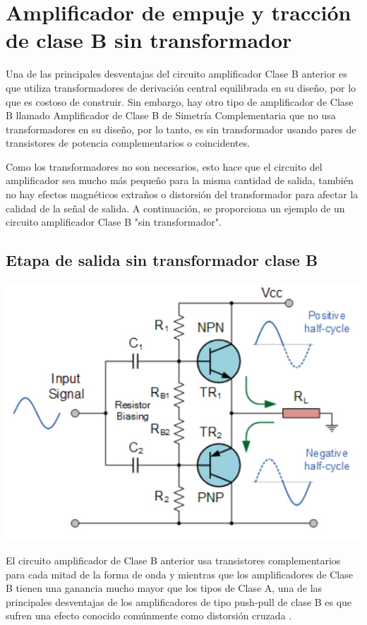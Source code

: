 \documentclass[12pt,a4paper]{article}
\begin{document}
\section{Amplificador de empuje y tracción de clase B sin transformador}
\begin{flushleft}
Una de las principales desventajas del circuito amplificador Clase B anterior es que utiliza transformadores de derivación central equilibrada en su diseño, por lo que es costoso de construir. Sin embargo, hay otro tipo de amplificador de Clase B llamado Amplificador de Clase B de Simetría Complementaria que no usa transformadores en su diseño, por lo tanto, es sin transformador usando pares de transistores de potencia complementarios o coincidentes.\linebreak

Como los transformadores no son necesarios, esto hace que el circuito del amplificador sea mucho más pequeño para la misma cantidad de salida, también no hay efectos magnéticos extraños o distorsión del transformador para afectar la calidad de la señal de salida. A continuación, se proporciona un ejemplo de un circuito amplificador Clase B "sin transformador".\linebreak
\begin{flushleft}
\subsection{Etapa de salida sin transformador clase B}
\begin{center}
\includegraphics[scale=0.6]{imagenes/parametros.JPG} \linebreak
\end{center}
El circuito amplificador de Clase B anterior usa transistores complementarios para cada mitad de la forma de onda y mientras que los amplificadores de Clase B tienen una ganancia mucho mayor que los tipos de Clase A, una de las principales desventajas de los amplificadores de tipo push-pull de clase B es que sufren una efecto conocido comúnmente como distorsión cruzada .\linebreak


\end{flushleft}
\end{flushleft}
\end{document}
